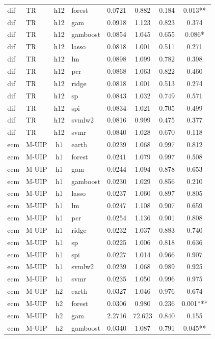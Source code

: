 \begin{ThreePartTable}
\begin{longtable}[t]{llclcccc}
dif & TR & h12 & forest & 0.0721 & 0.882 & 0.184 & 0.013**\\
dif & TR & h12 & gam & 0.0918 & 1.123 & 0.823 & 0.374\\
dif & TR & h12 & gamboost & 0.0854 & 1.045 & 0.655 & 0.086*\\
dif & TR & h12 & lasso & 0.0818 & 1.001 & 0.511 & 0.271\\
dif & TR & h12 & lm & 0.0898 & 1.099 & 0.782 & 0.398\\
dif & TR & h12 & pcr & 0.0868 & 1.063 & 0.822 & 0.460\\
dif & TR & h12 & ridge & 0.0818 & 1.001 & 0.513 & 0.274\\
dif & TR & h12 & sp & 0.0843 & 1.032 & 0.749 & 0.571\\
dif & TR & h12 & spi & 0.0834 & 1.021 & 0.705 & 0.499\\
dif & TR & h12 & svmlw2 & 0.0816 & 0.999 & 0.475 & 0.377\\
dif & TR & h12 & svmr & 0.0840 & 1.028 & 0.670 & 0.118\\
\addlinespace
ecm & M-UIP & h1 & earth & 0.0239 & 1.068 & 0.997 & 0.812\\
ecm & M-UIP & h1 & forest & 0.0241 & 1.079 & 0.997 & 0.508\\
ecm & M-UIP & h1 & gam & 0.0244 & 1.094 & 0.878 & 0.653\\
ecm & M-UIP & h1 & gamboost & 0.0230 & 1.029 & 0.856 & 0.210\\
ecm & M-UIP & h1 & lasso & 0.0237 & 1.060 & 0.897 & 0.805\\
ecm & M-UIP & h1 & lm & 0.0247 & 1.108 & 0.907 & 0.659\\
ecm & M-UIP & h1 & pcr & 0.0254 & 1.136 & 0.901 & 0.808\\
ecm & M-UIP & h1 & ridge & 0.0232 & 1.037 & 0.883 & 0.740\\
ecm & M-UIP & h1 & sp & 0.0225 & 1.006 & 0.818 & 0.636\\
ecm & M-UIP & h1 & spi & 0.0227 & 1.014 & 0.966 & 0.907\\
ecm & M-UIP & h1 & svmlw2 & 0.0239 & 1.068 & 0.989 & 0.925\\
ecm & M-UIP & h1 & svmr & 0.0235 & 1.050 & 0.996 & 0.975\\
\addlinespace
ecm & M-UIP & h2 & earth & 0.0327 & 1.046 & 0.976 & 0.674\\
ecm & M-UIP & h2 & forest & 0.0306 & 0.980 & 0.236 & 0.001***\\
ecm & M-UIP & h2 & gam & 2.2716 & 72.623 & 0.840 & 0.155\\
ecm & M-UIP & h2 & gamboost & 0.0340 & 1.087 & 0.791 & 0.045**\\

\end{longtable}
\end{ThreePartTable}
